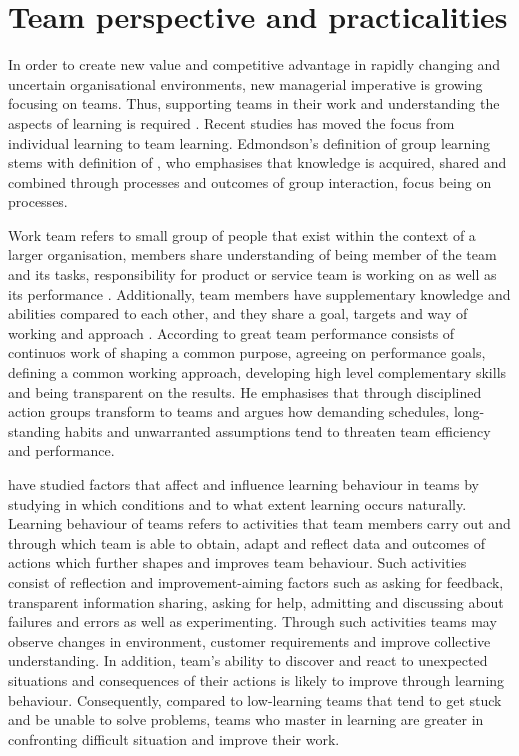 \section{Team perspective and practicalities}
In order to create new value and competitive advantage in rapidly changing and uncertain organisational environments, new managerial imperative is growing focusing on teams. Thus, supporting teams in their work and understanding the aspects of learning is required \citep{edmondson1999psychological}. Recent studies has moved the focus from individual learning to team learning. Edmondson's definition of group learning stems with definition of \citet{argote2001group}, who emphasises that knowledge is acquired, shared and combined through processes and outcomes of group interaction, focus being on processes. 

Work team refers to small group of people that exist within the context of a larger organisation, members share understanding of being member of the team and its tasks, responsibility for product or service team is working on \citep{hackman1987design,alderfer1983intergroup} as well as its performance \citep{edmondson1999psychological}. Additionally, team members have supplementary knowledge and abilities compared to each other, and they share a goal, targets and way of working and approach \citep{edmondson1999psychological}. According to  \citet{katzenbach1993wisdom} great team performance consists of continuos work of shaping a common purpose, agreeing on performance goals, defining a common working approach, developing high level complementary skills and being transparent on the results. He emphasises that through disciplined action groups transform to teams and argues how demanding schedules, long-standing habits and unwarranted assumptions tend to threaten team efficiency and performance.

\citet{edmondson1999psychological} have studied factors that affect and influence learning behaviour in teams by studying in which conditions and to what extent learning occurs naturally. Learning behaviour of teams refers to activities that team members carry out and through which team is able to obtain, adapt and reflect data and outcomes of actions which further shapes and improves team behaviour. Such activities consist of reflection and improvement-aiming factors such as asking for feedback, transparent information sharing, asking for help, admitting and discussing about failures and errors as well as experimenting. Through such activities teams may observe changes in environment, customer requirements and improve collective understanding. In addition, team's ability to discover and react to unexpected situations and consequences of their actions is likely to improve through learning behaviour. Consequently, compared to low-learning teams that tend to get stuck and be unable to solve problems, teams who master in learning are greater in confronting difficult situation and improve their work. \citep{edmondson1999psychological}


